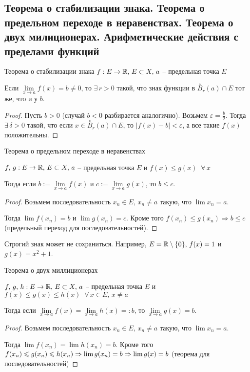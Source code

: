\subsection{Теорема о стабилизации знака. Теорема о предельном переходе в неравенствах. Теорема о двух милиционерах. Арифметические действия с пределами функций \href{https://youtu.be/BiTNBigkkyU?t=4469}{\Walley}}

\begin{theorem-non}
    Теорема о стабилизации знака
$f : E \to \mathbb{R}, \, E \subset X, \, a$ -- предельная точка $E$

Если $\lim\limits_{x \to a} f(x) = b \neq 0$, то $\exists \, r > 0$ такой, что знак функции в $\overset{\circ}{B}_r(a) \cap E$ тот же, что и у $b$.
\end{theorem-non}
\begin{proof}
    Пусть $b > 0$ (случай $b < 0$ разбирается аналогично). Возьмем $\varepsilon = \frac{b}{2}$. 
    Тогда $\exists \, \delta > 0$ такой, что если $x \in \overset{\circ}{B}_r(a) \cap E$, то $|f(x) - b| < \varepsilon$,
    а все такие $f(x)$ положительны.
\end{proof}

\begin{theorem-non}
    Теорема о предельном переходе в неравенствах

    $f, \, g : E \to \mathbb{R}, \, E \subset X, \, a$ -- предельная точка $E$ и $f(x) \leqslant g(x) \;\; \forall \, x$

    Тогда если $b := \lim\limits_{x \to a} f(x)$ и $c := \lim\limits_{x \to a} g(x)$, то $b \leqslant c$.
\end{theorem-non}
\begin{proof}
    Возьмем последовательность $x_n \in E, \, x_n \neq a$ такую, что $\lim x_n = a$. 

    Тогда $\lim f(x_n) = b$ и $\lim g(x_n) = c$. Кроме того $f(x_n) \leqslant g(x_n) \Rightarrow b \leqslant c$ (предельный переход для последовательностей).
\end{proof}
\begin{notice}
    Строгий знак может не сохраниться. Например, $E = \mathbb{R} \setminus \{0\}, \, f(x) = 1$ и $g(x) = x^2 + 1$.
\end{notice}

\begin{theorem-non}
    Теорема о двух миллиционерах

    $f, \, g, \, h : E \to \mathbb{R}, \, E \subset X, \, a$ -- предельная точка $E$ и $f(x) \leqslant g(x) \leqslant h(x) \;\; \forall \, x \in E, \, x \neq a$

    Тогда если $\lim\limits_{x \to a} f(x) = \lim\limits_{x \to a} h(x) =: b$, то $\lim\limits_{x \to a} g(x) = b$.
\end{theorem-non}
\begin{proof}
    Возьмем последовательность $x_n \in E, \, x_n \neq a$ такую, что $\lim x_n = a$. 

    Тогда $\lim f(x_n) = \lim h(x_n) = b$. Кроме того $f(x_n) \leqslant g(x_n) \leqslant h(x_n) \Rightarrow \lim g(x_n) = b \\ \Rightarrow \lim g(x) = b$
    (теорема для последовательностей)
\end{proof}

